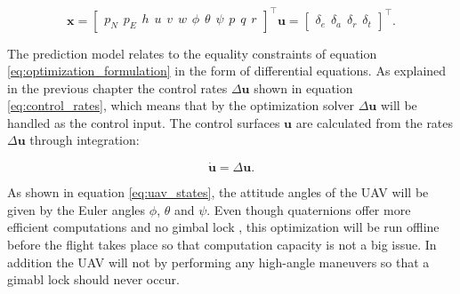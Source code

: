 \begin{subequations}
\begin{equation}
	\label{eq:uav_states}
	\mathbf{x} =
	\begin{bmatrix}
		p_N \hspace{5pt} p_E \hspace{5pt} h \hspace{5pt}
		u \hspace{5pt} v \hspace{5pt} w \hspace{5pt}
		\phi \hspace{5pt} \theta \hspace{5pt} \psi \hspace{5pt}
		p \hspace{5pt} q \hspace{5pt} r
	\end{bmatrix}^\intercal
\end{equation}
\begin{equation}
	\mathbf{u} =
	\begin{bmatrix}
		\delta_e \hspace{5pt} \delta_a \hspace{5pt} \delta_r \hspace{5pt} \delta_t
	\end{bmatrix}^\intercal.
\end{equation}
\end{subequations}

The prediction model relates to the equality constraints of equation \ref{eq:optimization_formulation} in the form of differential equations. As explained in the previous chapter the control rates $\Delta\mathbf{u}$ shown in equation \ref{eq:control_rates}, which means that by the optimization solver $\Delta\mathbf{u}$ will be handled as the control input. The control surfaces $\mathbf{u}$ are calculated from the rates $\Delta\mathbf{u}$ through integration:

\begin{equation}
	\mathbf{\dot{u}} = \Delta\mathbf{u}.
\end{equation}

As shown in equation \ref{eq:uav_states}, the attitude angles of the UAV will be given by the Euler angles $\phi$, $\theta$ and $\psi$. Even though quaternions offer more efficient computations and no gimbal lock \cite{uavBEARD}, this optimization will be run offline before the flight takes place so that computation capacity is not a big issue. In addition the UAV will not by performing any high-angle maneuvers so that a gimabl lock should never occur.



